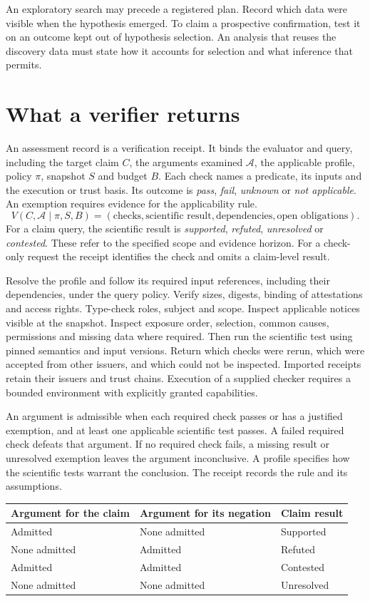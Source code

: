 \documentclass[11pt,a4paper]{article}
\newcommand{\partpage}[1]{\clearpage\section{#1}}
\newcommand{\topic}[1]{\par\smallskip{\sffamily\bfseries\color{ink}#1\par}\nobreak}
\begin{document}
An exploratory search may precede a registered plan. Record which data were visible when the hypothesis emerged. To claim a prospective confirmation, test it on an outcome kept out of hypothesis selection. An analysis that reuses the discovery data must state how it accounts for selection and what inference that permits.

\partpage{What a verifier returns}\label{sec:receipt}
An assessment record is a verification receipt. It binds the evaluator and query, including the target claim $C$, the arguments examined $\mathcal A$, the applicable profile, policy $\pi$, snapshot $S$ and budget $B$. Each check names a predicate, its inputs and the execution or trust basis. Its outcome is \emph{pass}, \emph{fail}, \emph{unknown} or \emph{not applicable}. An exemption requires evidence for the applicability rule.
\[
 V(C,\mathcal A\mid\pi,S,B)=(\text{checks},\text{scientific result},\text{dependencies},\text{open obligations}).
\]
For a claim query, the scientific result is \emph{supported}, \emph{refuted}, \emph{unresolved} or \emph{contested}. These refer to the specified scope and evidence horizon. For a check-only request the receipt identifies the check and omits a claim-level result.

\topic{Evaluating an argument}
Resolve the profile and follow its required input references, including their dependencies, under the query policy. Verify sizes, digests, binding of attestations and access rights. Type-check roles, subject and scope. Inspect applicable notices visible at the snapshot. Inspect exposure order, selection, common causes, permissions and missing data where required. Then run the scientific test using pinned semantics and input versions. Return which checks were rerun, which were accepted from other issuers, and which could not be inspected. Imported receipts retain their issuers and trust chains. Execution of a supplied checker requires a bounded environment with explicitly granted capabilities.

An argument is admissible when each required check passes or has a justified exemption, and at least one applicable scientific test passes. A failed required check defeats that argument. If no required check fails, a missing result or unresolved exemption leaves the argument inconclusive. A profile specifies how the scientific tests warrant the conclusion. The receipt records the rule and its assumptions.

\small
\begin{tabularx}{\linewidth}{@{}YYl@{}}
\toprule
\textbf{Argument for the claim} & \textbf{Argument for its negation} & \textbf{Claim result} \\ \midrule
Admitted & None admitted & Supported \\
None admitted & Admitted & Refuted \\
Admitted & Admitted & Contested \\
None admitted & None admitted & Unresolved \\
\bottomrule
\end{tabularx}
\normalsize
\end{document}
